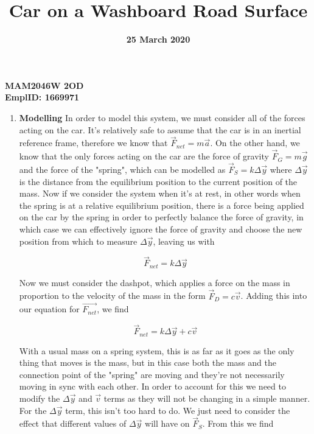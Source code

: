 \documentclass[12pt]{article}
\title{Car on a Washboard Road Surface}
\date{\textbf{25 March 2020}}
\author{}
\begin{document}
    \maketitle
    \center
    \textbf{\large{MAM2046W 2OD}}\\
    \textbf{\large{EmplID: 1669971}}\\

    \begin{enumerate}
        \item \textbf{Modelling} \newline
        In order to model this system, we must consider all of the forces acting on the car. 
        It's relatively safe to assume that the car is in an inertial reference frame, therefore 
        we know that $\vec{F}_{net}=m\vec{a}$. On the other hand, we know that the only forces 
        acting on the car are the force of gravity $\vec{F}_G = m\vec{g}$ and the force of the 
        "spring", which can be modelled as $\vec{F}_S = k\Delta \vec{y}$ where $\Delta \vec{y}$ 
        is the distance from the equilibrium position to the current position of the mass.
        Now if we consider the system when it's at rest, in other words when the spring is at a 
        relative equilibrium position, there is a force being applied on the car by the spring in 
        order to perfectly balance the force of gravity, in which case we can effectively ignore 
        the force of gravity and choose the new position from which to measure $\Delta \vec{y}$, 
        leaving us with

        \begin{equation}
            \vec{F}_{net} = k\Delta \vec{y}
        \end{equation}

        \noindent
        Now we must consider the dashpot, which applies a force on the mass in proportion to 
        the velocity of the mass in the form $\vec{F}_D = c\vec{v}$. Adding this into our 
        equation for $\vec{F_{net}}$, we find 

        \begin{equation}
            \vec{F}_{net} = k\Delta \vec{y} + c\vec{v}
        \end{equation}

        \noindent
        With a usual mass on a spring system, this is as far as it goes as the only thing that 
        moves is the mass, but in this case both the mass and the connection point of the 
        "spring" are moving and they're not necessarily moving in sync with each other. In 
        order to account for this we need to modify the $\Delta\vec{y}$ and $\vec{v}$ terms 
        as they will not be changing in a simple manner. For the $\Delta\vec{y}$ term, this 
        isn't too hard to do. We just need to consider the effect that different values of 
        $\Delta\vec{y}$ will have on $\vec{F}_S$. From this we find 


\end{enumerate}
\end{document}
